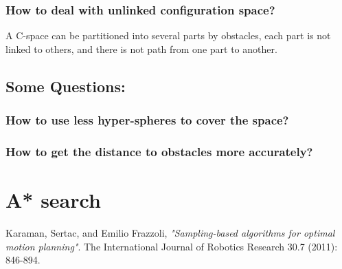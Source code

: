 \documentclass{article}
\begin{document}
                \subsubsection{How to deal with unlinked configuration space?}
                        A C-space can be partitioned into several parts by obstacles, each part is not linked to others, and there is not path from one part to another. 

	\subsection{Some Questions:}
 		\subsubsection{How to use less hyper-spheres to cover the space?}
 		\subsubsection{How to get the distance to obstacles more accurately?}

\section{A* search}


\begin{thebibliography}{9}

  Karaman, Sertac, and Emilio Frazzoli,
  \emph{"Sampling-based algorithms for optimal motion planning"}.
  The International Journal of Robotics Research 30.7 (2011): 846-894.
\end{thebibliography}
\end{document}
